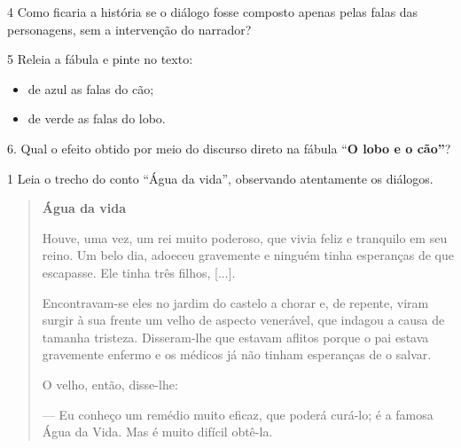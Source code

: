 
\num{4} Como ficaria a história se o diálogo fosse composto apenas pelas falas
das personagens, sem a intervenção do narrador?



\num{5} Releia a fábula e pinte no texto:

\begin{itemize}
\item de azul as falas do cão;

\item de verde as falas do lobo.
\end{itemize}

6. Qual o efeito obtido por meio do discurso direto na fábula ``\textbf{O
lobo e o cão''}?



\num{1} Leia o trecho do conto ``Água da vida'', observando atentamente 
os diálogos.


\begin{quote}
\textbf{Água da vida}

Houve, uma vez, um rei muito poderoso, que vivia feliz e tranquilo em
seu reino. Um belo dia, adoeceu gravemente e ninguém tinha esperanças de
que escapasse. Ele tinha três filhos, {[}...{]}.

Encontravam-se eles no jardim do castelo a chorar e, de repente, viram
surgir à sua frente um velho de aspecto venerável, que indagou a causa
de tamanha tristeza. Disseram-lhe que estavam aflitos porque o pai
estava gravemente enfermo e os médicos já não tinham esperanças de o
salvar.

O velho, então, disse-lhe:

--- Eu conheço um remédio muito eficaz, que poderá curá-lo; é a famosa
Água da Vida. Mas é muito difícil obtê-la.
\end{quote}

